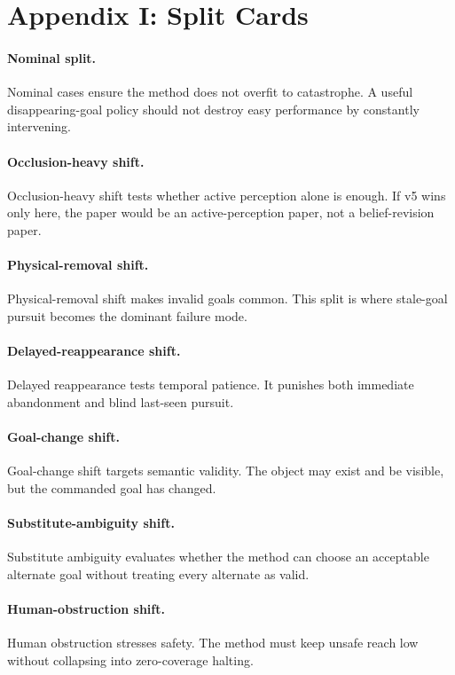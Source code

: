 \documentclass{article}
\begin{document}
\section{Appendix I: Split Cards}
\paragraph{Nominal split.}
Nominal cases ensure the method does not overfit to catastrophe. A useful disappearing-goal policy should not destroy easy performance by constantly intervening.

\paragraph{Occlusion-heavy shift.}
Occlusion-heavy shift tests whether active perception alone is enough. If v5 wins only here, the paper would be an active-perception paper, not a belief-revision paper.

\paragraph{Physical-removal shift.}
Physical-removal shift makes invalid goals common. This split is where stale-goal pursuit becomes the dominant failure mode.

\paragraph{Delayed-reappearance shift.}
Delayed reappearance tests temporal patience. It punishes both immediate abandonment and blind last-seen pursuit.

\paragraph{Goal-change shift.}
Goal-change shift targets semantic validity. The object may exist and be visible, but the commanded goal has changed.

\paragraph{Substitute-ambiguity shift.}
Substitute ambiguity evaluates whether the method can choose an acceptable alternate goal without treating every alternate as valid.

\paragraph{Human-obstruction shift.}
Human obstruction stresses safety. The method must keep unsafe reach low without collapsing into zero-coverage halting.
\end{document}
